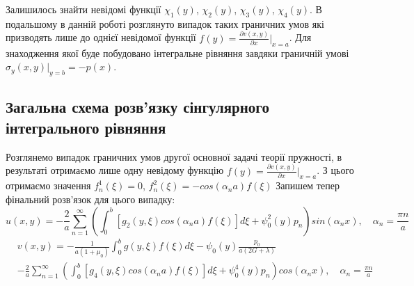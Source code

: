 Залишилось знайти невідомі функції $\chi_1(y)$, $\chi_2(y)$, $\chi_3(y)$, $\chi_4(y)$.
В подальшому в данній роботі розглянуто випадок таких граничних умов які призводять лише до однієї невідомої функції $f(y) = \frac{\partial v(x,y)}{\partial x}|_{x=a}$.
Для знаходження якої буде побудовано інтегральне рівняння завдяки граничній умові $\sigma_y(x, y) |_{y=b} = -p(x)$.

\subsection{Загальна схема розв'язку сінгулярного інтегрального рівняння}
Розглянемо випадок граничних умов другої основної задачі теорії пружності, в результаті отримаємо лише одну невідому функцію $f(y) = \frac{\partial v(x,y)}{\partial x}|_{x=a}$.
З цього отримаємо значення $f_n^1(\xi) = 0$, $f_n^2(\xi)= -cos(\alpha_n a) f(\xi) $
Запишем тепер фінальний розв'язок для цього випадку:
\begin{equation}
    u(x,y) = -\frac{2}{a} \sum_{n=1}^{\infty} \left( \int_0^b \left[g_2(y, \xi)cos(\alpha_n a) f(\xi) \right]d\xi + \psi_0^2(y) p_n \right) sin(\alpha_n x), \quad \alpha_n = \frac{\pi n}{a}
\end{equation}
\begin{align}
    &v(x,y) = -\frac{1}{a(1+\mu_0)} \int_{0}^{b}g(y,\xi) f(\xi) d\xi - \psi_0(y) \frac{p_0}{a(2G + \lambda)} \\
    &- \frac{2}{a} \sum_{n=1}^{\infty} \left( \int_0^b \left[g_4(y, \xi) cos(\alpha_n a) f(\xi) \right]d\xi + \psi_0^4(y) p_n  \right) cos(\alpha_n x), \quad \alpha_n = \frac{\pi n}{a}
\end{align}

